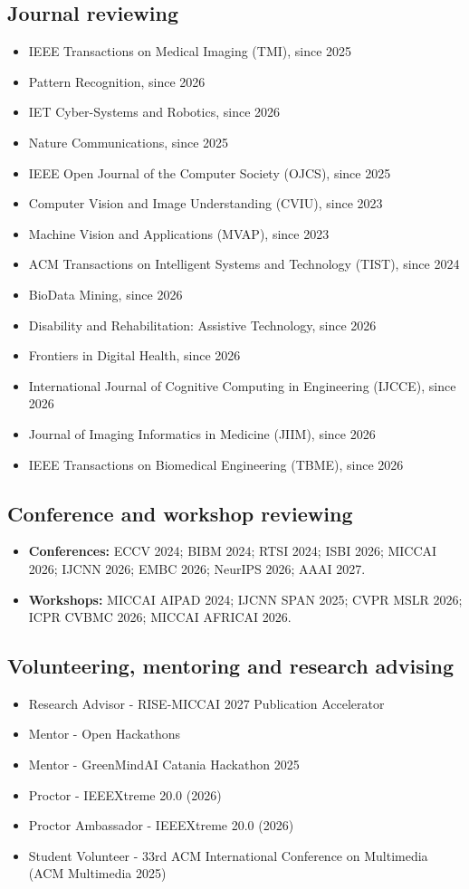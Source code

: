 \documentclass[10pt,a4paper]{article}
\begin{document}
\subsection{Journal reviewing}
\begin{itemize}
\item IEEE Transactions on Medical Imaging (TMI), since 2025
\item Pattern Recognition, since 2026
\item IET Cyber-Systems and Robotics, since 2026
\item Nature Communications, since 2025
\item IEEE Open Journal of the Computer Society (OJCS), since 2025
\item Computer Vision and Image Understanding (CVIU), since 2023
\item Machine Vision and Applications (MVAP), since 2023
\item ACM Transactions on Intelligent Systems and Technology (TIST), since 2024
\item BioData Mining, since 2026
\item Disability and Rehabilitation: Assistive Technology, since 2026
\item Frontiers in Digital Health, since 2026
\item International Journal of Cognitive Computing in Engineering (IJCCE), since 2026
\item Journal of Imaging Informatics in Medicine (JIIM), since 2026
\item IEEE Transactions on Biomedical Engineering (TBME), since 2026
\end{itemize}
\subsection{Conference and workshop reviewing}
\begin{itemize}
\item \textbf{Conferences:} ECCV 2024; BIBM 2024; RTSI 2024; ISBI 2026; MICCAI 2026; IJCNN 2026; EMBC 2026; NeurIPS 2026; AAAI 2027.
\item \textbf{Workshops:} MICCAI AIPAD 2024; IJCNN SPAN 2025; CVPR MSLR 2026; ICPR CVBMC 2026; MICCAI AFRICAI 2026.
\end{itemize}
\subsection{Volunteering, mentoring and research advising}
\begin{itemize}
\item Research Advisor - RISE-MICCAI 2027 Publication Accelerator
\item Mentor - Open Hackathons
\item Mentor - GreenMindAI Catania Hackathon 2025
\item Proctor - IEEEXtreme 20.0 (2026)
\item Proctor Ambassador - IEEEXtreme 20.0 (2026)
\item Student Volunteer - 33rd ACM International Conference on Multimedia (ACM Multimedia 2025)
\end{itemize}
\end{document}
